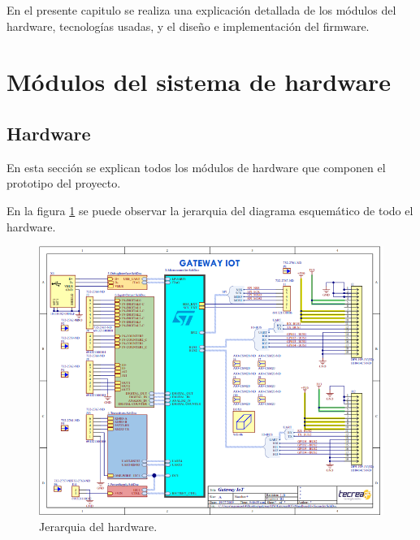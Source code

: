 En el presente capitulo se realiza una explicación detallada de los módulos del hardware, tecnologías usadas, y el diseño e implementación del firmware.

\section{Módulos del sistema de hardware}

\subsection{Hardware}

En esta sección se explican todos los módulos de hardware que componen el prototipo del proyecto.

En la figura \ref{fig:Hierarchy} se puede observar la jerarquia del diagrama esquemático de todo el hardware.

\begin{figure}[h]
	\centering
	\includegraphics[scale=.65]{./Figures/Hierarchy.PNG}
	\caption{Jerarquia del hardware.}
	\label{fig:Hierarchy}
\end{figure}

